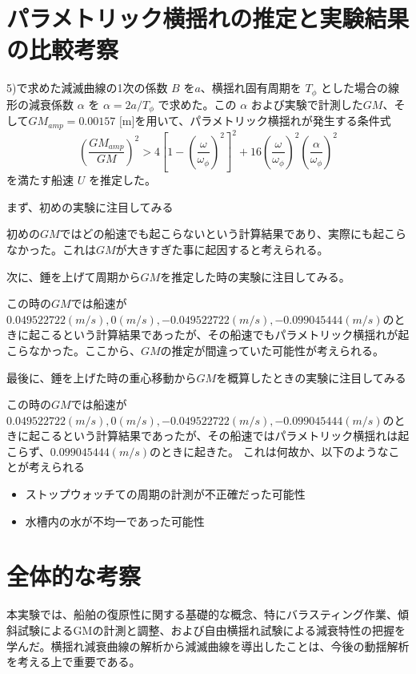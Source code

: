 \documentclass[dvipdfmx,a4paper]{jreport} %
\begin{document}
\section{パラメトリック横揺れの推定と実験結果の比較考察}
5)で求めた減滅曲線の1次の係数 $B$ を$a$、横揺れ固有周期を $T_\phi$ とした場合の線形の減衰係数 $\alpha$ を $\alpha = 2a/T_\phi$ で求めた。この $\alpha$ および実験で計測した$GM$、そして$GM_{amp}=0.00157 \text{ [m]}$を用いて、パラメトリック横揺れが発生する条件式
\begin{equation}
   \left(\frac{GM_{amp}}{GM}\right)^2 > 4 \left[1 - \left(\frac{\omega}{\omega_\phi}\right)^2\right]^2 + 16 \left(\frac{\omega}{\omega_\phi}\right)^2 \left(\frac{\alpha}{\omega_\phi}\right)^2 
\end{equation}
を満たす船速 $U$ を推定した。
\vspace{5mm}


まず、初めの実験に注目してみる


初めの$GM$ではどの船速でも起こらないという計算結果であり、実際にも起こらなかった。これは$GM$が大きすぎた事に起因すると考えられる。

\vspace{5mm}
次に、錘を上げて周期から$GM$を推定した時の実験に注目してみる。


この時の$GM$では船速が$0.049522722(m/s), 0(m/s), -0.049522722(m/s), -0.099045444(m/s)$のときに起こるという計算結果であったが、その船速でもパラメトリック横揺れが起こらなかった。ここから、$GM$の推定が間違っていた可能性が考えられる。

\vspace{5mm}
最後に、錘を上げた時の重心移動から$GM$を概算したときの実験に注目してみる

この時の$GM$では船速が$0.049522722(m/s), 0(m/s), -0.049522722(m/s), -0.099045444(m/s)$のときに起こるという計算結果であったが、その船速ではパラメトリック横揺れは起こらず、$0.099045444(m/s)$のときに起きた。
これは何故か、以下のようなことが考えられる
\begin{itemize}
    \item ストップウォッチての周期の計測が不正確だった可能性
    \item 水槽内の水が不均一であった可能性
\end{itemize}

\section{全体的な考察}
本実験では、船舶の復原性に関する基礎的な概念、特にバラスティング作業、傾斜試験によるGMの計測と調整、および自由横揺れ試験による減衰特性の把握を学んだ。横揺れ減衰曲線の解析から減滅曲線を導出したことは、今後の動揺解析を考える上で重要である。
\end{document}
